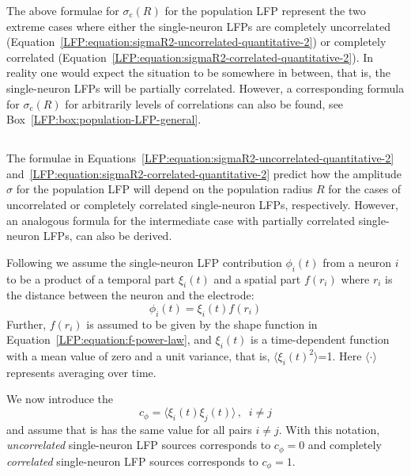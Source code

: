 The above formulae for $\sigma_\text{c}(R)$ for the population LFP represent the two extreme cases where either the single-neuron
LFPs are completely uncorrelated (Equation~\ref{LFP:equation:sigmaR2-uncorrelated-quantitative-2}) or completely correlated 
(Equation~\ref{LFP:equation:sigmaR2-correlated-quantitative-2}). In reality one would expect the situation to be somewhere in between, that is,
the single-neuron LFPs will be partially correlated. However, a corresponding formula for $\sigma_\text{c}(R)$ for arbitrarily levels of correlations can also be found, see Box~\ref{LFP:box:population-LFP-general}. 

 
 
 
\subsection{}
The formulae in Equations~\ref{LFP:equation:sigmaR2-uncorrelated-quantitative-2} 
and~\ref{LFP:equation:sigmaR2-correlated-quantitative-2} predict how the amplitude  $\sigma$ 
for the population LFP will depend on the population radius $R$ for the cases of uncorrelated or completely correlated
single-neuron LFPs, respectively. However, an analogous formula for the intermediate case with partially correlated single-neuron LFPs, can
also be derived.

Following  we assume the single-neuron LFP contribution $\phi_i(t)$ from a neuron $i$ to be a product of a 
temporal part $\xi_i(t)$ and a spatial part $f(r_i)$ where $r_i$ is the distance between the neuron and the electrode:
\begin{equation}  
\phi_i(t)= \xi_i(t) f(r_i)
\label{LFP:box:equation:phii}
\end{equation}
Further, $f(r_i)$ is assumed to be given by the shape function in 
Equation~\ref{LFP:equation:f-power-law}, and $\xi_i(t)$ is a time-dependent function with a mean value of zero and a unit variance, that is,
$\langle \xi_i(t)^2 \rangle$=1. Here $\langle \cdot \rangle$ represents averaging over time.

We now introduce the  
\begin{equation}
c_\phi=\langle \xi_i(t) \xi_j(t)\rangle\, ,\;\; i \neq j
\label{LFP:box:equation:phii}
\end{equation}
and assume that is has the same value for all pairs $i \neq j$. With this notation,  
\emph{uncorrelated} single-neuron LFP sources corresponds to $c_\phi=0$ and 
completely \emph{correlated} single-neuron LFP sources corresponds to $c_\phi=1$.

